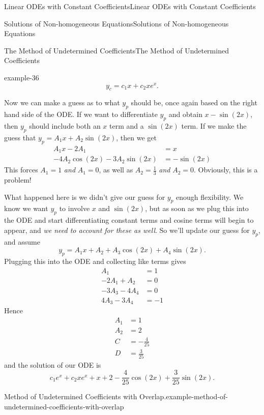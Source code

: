 \documentclass[10pt,]{book}
\numberwithin{equation}{section}
\newcommand{\amp}{&}
\begin{document}
\begin{chapterptx}{Linear ODEs with Constant Coefficients}{}{Linear ODEs with Constant Coefficients}{}{}
\begin{sectionptx}{Solutions of Non-homogeneous Equations}{}{Solutions of Non-homogeneous Equations}{}{}
\begin{subsectionptx}{The Method of Undetermined Coefficients}{}{The Method of Undetermined Coefficients}{}{}
\begin{example}{}{example-36}
\begin{equation*}
y_{c} = c_{1}x + c_{2}xe^{x}.
\end{equation*}
%
\par
\hypertarget{p-236}{}%
Now we can make a guess as to what \(y_{p}\) should be, once again based on the right hand side of the ODE. If we want to differentiate \(y_{p}\) and obtain \(x - \sin(2x)\), then \(y_{p}\) should include both an \(x\) term and a \(\sin(2x)\) term. If we make the guess that \(y_{p} = A_{1}x + A_{2}\sin(2x)\), then we get%
\begin{align*}
A_{1}x - 2A_{1} \amp = x \\
-4A_{2}\cos(2x) - 3A_{2}\sin(2x) \amp = -\sin(2x) 
\end{align*}
This forces \(A_{1} = 1\) \emph{and} \(A_{1} = 0\), as well as \(A_{2} = \frac{1}{3}\) \emph{and} \(A_{2} = 0\). Obviously, this is a problem!%
\par
\hypertarget{p-237}{}%
What happened here is we didn't give our guess for \(y_{p}\) enough flexibility. We know we want \(y_{p}\) to involve \(x\) and \(\sin(2x)\), but as soon as we plug this into the ODE and start differentiating constant terms and cosine terms will begin to appear, and \emph{we need to account for these as well}. So we'll update our guess for \(y_{p}\), and assume%
\begin{equation*}
y_{p} = A_{1}x + A_{2} + A_{3}\cos(2x) + A_{4}\sin(2x).
\end{equation*}
Plugging this into the ODE and collecting like terms gives%
\begin{align*}
A_{1} \amp = 1\\
-2A_{1} + A_{2} \amp = 0\\
-3A_{3} - 4A_{4} \amp = 0\\
4A_{3} - 3A_{4} \amp = -1
\end{align*}
Hence%
\begin{align*}
A_{1} \amp = 1 \\
A_{2} \amp = 2 \\
C \amp = -\frac{4}{25} \\
D \amp = \frac{3}{25} 
\end{align*}
and the solution of our ODE is%
\begin{equation*}
c_{1}e^{x} + c_{2}xe^{x} + x + 2 - \frac{4}{25}\cos(2x) + \frac{3}{25}\sin(2x).
\end{equation*}
%
\end{example}
\begin{example}{Method of Undetermined Coefficients with Overlap.}{example-method-of-undetermined-coefficients-with-overlap}%

\end{example}
\end{subsectionptx}
\end{sectionptx}
\end{chapterptx}
\end{document}
